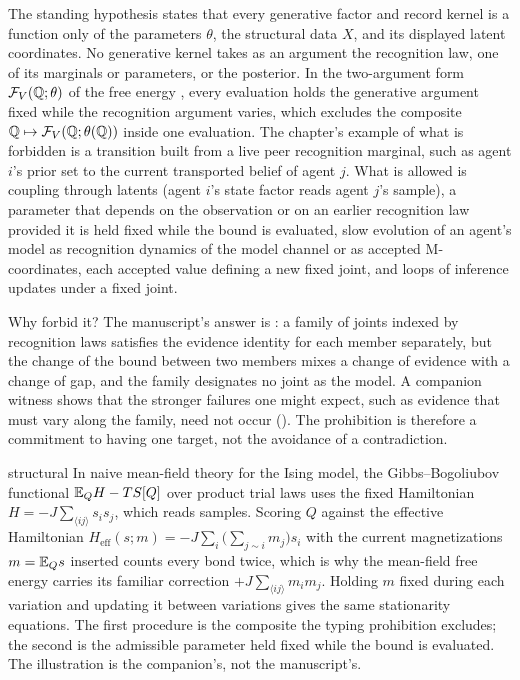The standing hypothesis  states that every generative factor and record kernel is a
function only of the parameters $\theta$, the structural data $X$, and its displayed latent coordinates. No
generative kernel takes as an argument the recognition law, one of its marginals or parameters, or the posterior.
In the two-argument form $\mathcal F_V(\mathbb Q;\theta)$ of the free energy \citep{Neal1998}, every evaluation holds
the generative argument fixed while the recognition argument varies, which excludes the composite
$\mathbb Q\mapsto\mathcal F_V(\mathbb Q;\theta(\mathbb Q))$ inside one evaluation. The chapter's example of what is
forbidden is a transition built from a live peer recognition marginal, such as agent $i$'s prior set to the
current transported belief of agent $j$. What is allowed is coupling through latents (agent $i$'s state factor
reads agent $j$'s sample), a parameter that depends on the observation or on an earlier recognition law provided
it is held fixed while the bound is evaluated, slow evolution of an agent's model as recognition dynamics of the
model channel or as accepted M-coordinates, each accepted value defining a new fixed joint, and loops of inference
updates under a fixed joint.

Why forbid it? The manuscript's answer is : a family of joints indexed by
recognition laws satisfies the evidence identity for each member separately, but the change of the bound between
two members mixes a change of evidence with a change of gap, and the family designates no joint as the model. A
companion witness shows that the stronger failures one might expect, such as evidence that must vary along the
family, need not occur (). The prohibition is therefore a commitment to having
one target, not the avoidance of a contradiction.

\begin{analogy}{structural}
In naive mean-field theory for the Ising model, the Gibbs--Bogoliubov functional $\mathbb E_QH-TS[Q]$ over product trial
laws uses the fixed Hamiltonian $H=-J\sum_{\langle ij\rangle}s_is_j$, which reads samples. Scoring $Q$ against the
effective Hamiltonian $H_{\mathrm{eff}}(s;m)=-J\sum_i\bigl(\sum_{j\sim i}m_j\bigr)s_i$ with the current magnetizations
$m=\mathbb E_Qs$ inserted counts every bond twice, which is why the mean-field free energy carries its familiar correction
$+J\sum_{\langle ij\rangle}m_im_j$. Holding $m$ fixed during each variation and updating it between variations gives
the same stationarity equations. The first procedure is the composite the typing prohibition excludes; the second is
the admissible parameter held fixed while the bound is evaluated. The illustration is the companion's, not the
manuscript's.
\end{analogy}

